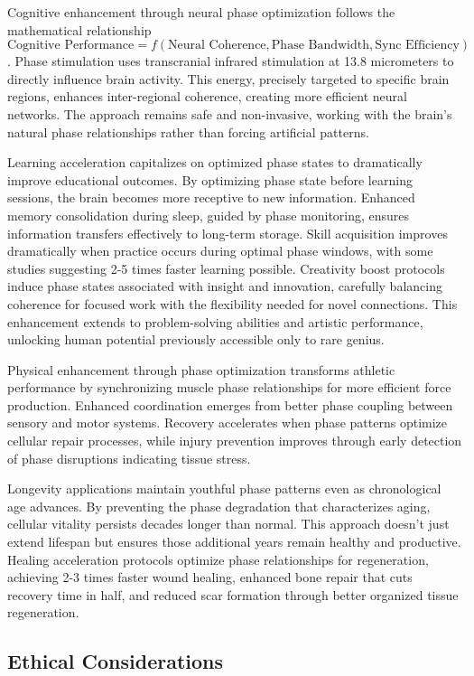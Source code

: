 \documentclass[12pt,a4paper]{report}
\begin{document}
Cognitive enhancement through neural phase optimization follows the mathematical relationship $\text{Cognitive Performance} = f(\text{Neural Coherence}, \text{Phase Bandwidth}, \text{Sync Efficiency})$. Phase stimulation uses transcranial infrared stimulation at 13.8 micrometers to directly influence brain activity. This energy, precisely targeted to specific brain regions, enhances inter-regional coherence, creating more efficient neural networks. The approach remains safe and non-invasive, working with the brain's natural phase relationships rather than forcing artificial patterns.

Learning acceleration capitalizes on optimized phase states to dramatically improve educational outcomes. By optimizing phase state before learning sessions, the brain becomes more receptive to new information. Enhanced memory consolidation during sleep, guided by phase monitoring, ensures information transfers effectively to long-term storage. Skill acquisition improves dramatically when practice occurs during optimal phase windows, with some studies suggesting 2-5 times faster learning possible. Creativity boost protocols induce phase states associated with insight and innovation, carefully balancing coherence for focused work with the flexibility needed for novel connections. This enhancement extends to problem-solving abilities and artistic performance, unlocking human potential previously accessible only to rare genius.

Physical enhancement through phase optimization transforms athletic performance by synchronizing muscle phase relationships for more efficient force production. Enhanced coordination emerges from better phase coupling between sensory and motor systems. Recovery accelerates when phase patterns optimize cellular repair processes, while injury prevention improves through early detection of phase disruptions indicating tissue stress.

Longevity applications maintain youthful phase patterns even as chronological age advances. By preventing the phase degradation that characterizes aging, cellular vitality persists decades longer than normal. This approach doesn't just extend lifespan but ensures those additional years remain healthy and productive. Healing acceleration protocols optimize phase relationships for regeneration, achieving 2-3 times faster wound healing, enhanced bone repair that cuts recovery time in half, and reduced scar formation through better organized tissue regeneration.

\subsection{Ethical Considerations}
\end{document}
